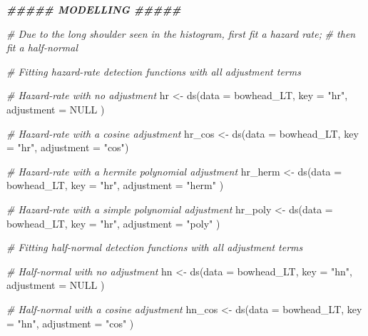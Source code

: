 \documentclass[
  12pt,
]{article}
\newenvironment{Shaded}{\begin{snugshade}}{\end{snugshade}}
\newcommand{\AttributeTok}[1]{\textcolor[rgb]{0.77,0.63,0.00}{#1}}
\newcommand{\CommentTok}[1]{\textcolor[rgb]{0.56,0.35,0.01}{\textit{#1}}}
\newcommand{\ConstantTok}[1]{\textcolor[rgb]{0.00,0.00,0.00}{#1}}
\newcommand{\DocumentationTok}[1]{\textcolor[rgb]{0.56,0.35,0.01}{\textbf{\textit{#1}}}}
\newcommand{\FunctionTok}[1]{\textcolor[rgb]{0.00,0.00,0.00}{#1}}
\newcommand{\NormalTok}[1]{#1}
\newcommand{\OtherTok}[1]{\textcolor[rgb]{0.56,0.35,0.01}{#1}}
\newcommand{\StringTok}[1]{\textcolor[rgb]{0.31,0.60,0.02}{#1}}
\begin{document}
\begin{Shaded}
\begin{Highlighting}[]
\DocumentationTok{\#\#\#\#\#     MODELLING     \#\#\#\#\#}

\CommentTok{\# Due to the long shoulder seen in the histogram, first fit a hazard rate;}
\CommentTok{\#   then fit a half{-}normal}


\CommentTok{\# Fitting hazard{-}rate detection functions with all adjustment terms }

\CommentTok{\# Hazard{-}rate with no adjustment }
\NormalTok{hr }\OtherTok{\textless{}{-}} \FunctionTok{ds}\NormalTok{(}\AttributeTok{data =}\NormalTok{ bowhead\_LT, }
         \AttributeTok{key =} \StringTok{"hr"}\NormalTok{, }
         \AttributeTok{adjustment =} \ConstantTok{NULL}\NormalTok{ ) }

\CommentTok{\# Hazard{-}rate with a cosine adjustment }
\NormalTok{hr\_cos }\OtherTok{\textless{}{-}} \FunctionTok{ds}\NormalTok{(}\AttributeTok{data =}\NormalTok{ bowhead\_LT, }
             \AttributeTok{key =} \StringTok{"hr"}\NormalTok{, }
             \AttributeTok{adjustment =} \StringTok{"cos"}\NormalTok{)}

\CommentTok{\# Hazard{-}rate with a hermite polynomial adjustment }
\NormalTok{hr\_herm }\OtherTok{\textless{}{-}} \FunctionTok{ds}\NormalTok{(}\AttributeTok{data =}\NormalTok{ bowhead\_LT, }
              \AttributeTok{key =} \StringTok{"hr"}\NormalTok{, }
              \AttributeTok{adjustment =} \StringTok{"herm"}\NormalTok{ )}

\CommentTok{\# Hazard{-}rate with a simple polynomial adjustment }
\NormalTok{hr\_poly }\OtherTok{\textless{}{-}} \FunctionTok{ds}\NormalTok{(}\AttributeTok{data =}\NormalTok{ bowhead\_LT, }
              \AttributeTok{key =} \StringTok{"hr"}\NormalTok{, }
              \AttributeTok{adjustment =} \StringTok{"poly"}\NormalTok{ ) }



\CommentTok{\# Fitting half{-}normal detection functions with all adjustment terms }

\CommentTok{\# Half{-}normal with no adjustment }
\NormalTok{hn }\OtherTok{\textless{}{-}} \FunctionTok{ds}\NormalTok{(}\AttributeTok{data =}\NormalTok{ bowhead\_LT, }
         \AttributeTok{key =} \StringTok{"hn"}\NormalTok{, }
         \AttributeTok{adjustment =} \ConstantTok{NULL}\NormalTok{ ) }

\CommentTok{\# Half{-}normal with a cosine adjustment}
\NormalTok{hn\_cos }\OtherTok{\textless{}{-}} \FunctionTok{ds}\NormalTok{(}\AttributeTok{data =}\NormalTok{ bowhead\_LT, }
             \AttributeTok{key =} \StringTok{"hn"}\NormalTok{, }
             \AttributeTok{adjustment =} \StringTok{"cos"}\NormalTok{ ) }


\end{Highlighting}
\end{Shaded}
\end{document}
